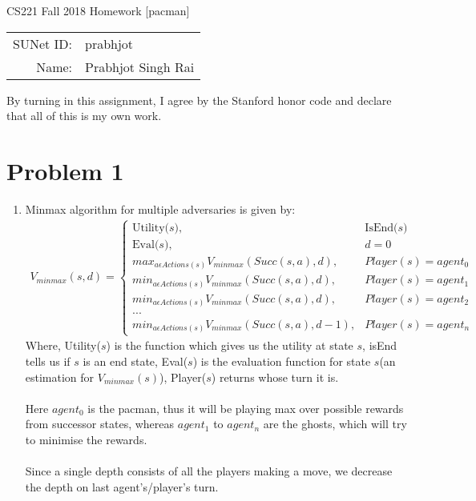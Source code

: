 \documentclass[12pt]{article}
\begin{document}
\begin{center}
{\Large CS221 Fall 2018 Homework [pacman]}

\begin{tabular}{rl}
SUNet ID: & prabhjot \\
Name: & Prabhjot Singh Rai
\end{tabular}
\end{center}

By turning in this assignment, I agree by the Stanford honor code and declare
that all of this is my own work.

\section*{Problem 1}

\begin{enumerate}[label=(\alph*)]
  \item Minmax algorithm for multiple adversaries is given by:
    \begin{align*}
  V_{minmax}(s, d) = \begin{cases} 
  \text{Utility($s$)}, & \text{IsEnd($s$)} \\
  \text{Eval($s$)}, & d = 0 \\
  max_{a\epsilon Actions(s)} V_{minmax}(Succ(s, a), d), & Player(s) = agent_0 \\
  min_{a\epsilon Actions(s)} V_{minmax}(Succ(s, a), d), & Player(s) = agent_1 \\
  min_{a\epsilon Actions(s)} V_{minmax}(Succ(s, a), d), & Player(s) = agent_2 \\
  ... \\
  min_{a\epsilon Actions(s)} V_{minmax}(Succ(s, a), d - 1), & Player(s) = agent_n
  \end{cases}
  \end{align*}
  Where, Utility($s$) is the function which gives us the utility at state $s$, isEnd tells us if $s$ is an end state, Eval($s$) is the evaluation function for state $s$(an estimation for $V_{minmax}(s)$), Player($s$) returns whose turn it is. \\ \\
  Here $agent_0$ is the pacman, thus it will be playing max over possible rewards from successor states, whereas $agent_1$ to $agent_n$ are the ghosts, which will try to minimise the rewards. \\ \\
  Since a single depth consists of all the players making a move, we decrease the depth on last agent's/player's turn.
\end{enumerate}
\end{document}
